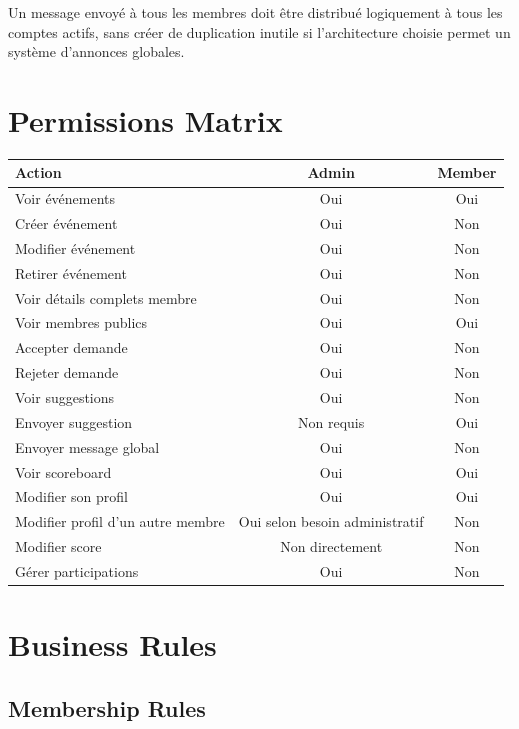 \documentclass[11pt,a4paper]{report}
\begin{document}
Un message envoyé à tous les membres doit être distribué logiquement à tous les comptes actifs, sans créer de duplication inutile si l'architecture choisie permet un système d'annonces globales.

\chapter{Permissions Matrix}

\begin{longtable}{p{}cc}
\toprule
\textbf{Action} & \textbf{Admin} & \textbf{Member}\\
\midrule
Voir événements & Oui & Oui\\
Créer événement & Oui & Non\\
Modifier événement & Oui & Non\\
Retirer événement & Oui & Non\\
Voir détails complets membre & Oui & Non\\
Voir membres publics & Oui & Oui\\
Accepter demande & Oui & Non\\
Rejeter demande & Oui & Non\\
Voir suggestions & Oui & Non\\
Envoyer suggestion & Non requis & Oui\\
Envoyer message global & Oui & Non\\
Voir scoreboard & Oui & Oui\\
Modifier son profil & Oui & Oui\\
Modifier profil d'un autre membre & Oui selon besoin administratif & Non\\
Modifier score & Non directement & Non\\
Gérer participations & Oui & Non\\
\bottomrule
\end{longtable}

\chapter{Business Rules}

\section{Membership Rules}
\end{document}
